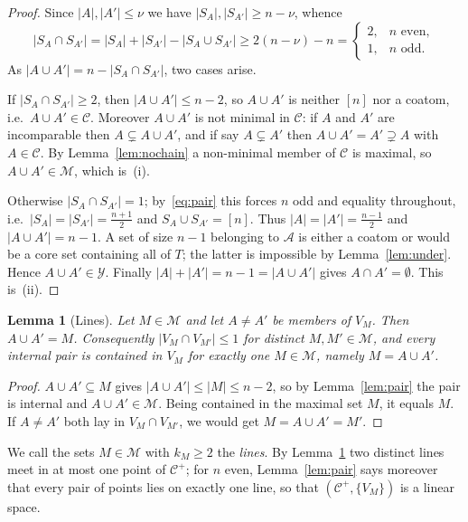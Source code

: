 \documentclass[11pt,a4paper]{amsart}
\theoremstyle{plain}
\newtheorem{lemma}[theorem]{Lemma}
\theoremstyle{definition}
\newcommand{\A}{\mathcal{A}}
\newcommand{\Cc}{\mathcal{C}}
\newcommand{\Mm}{\mathcal{M}}
\newcommand{\Yy}{\mathcal{Y}}
\newcommand{\Cp}{\Cc^{+}}
\begin{document}
\begin{proof}
Since $|A|,|A'|\le\nu$ we have
$|S_A|,|S_{A'}|\ge n-\nu$, whence
\begin{equation}\label{eq:pair}
  |S_A\cap S_{A'}|
  =
  |S_A|+|S_{A'}|-|S_A\cup S_{A'}|
  \ge
  2(n-\nu)-n
  =
  \begin{cases}
    2,& n\text{ even},\\
    1,& n\text{ odd}.
  \end{cases}
\end{equation}
As $|A\cup A'|=n-|S_A\cap S_{A'}|$, two cases arise.

If $|S_A\cap S_{A'}|\ge2$, then $|A\cup A'|\le n-2$, so $A\cup A'$ is neither
$[n]$ nor a coatom, i.e.\ $A\cup A'\in\Cc$. Moreover $A\cup A'$ is not minimal
in $\Cc$: if $A$ and $A'$ are incomparable then
$A\subsetneq A\cup A'$, and if say $A\subsetneq A'$ then
$A\cup A'=A'\supsetneq A$ with $A\in\Cc$. By Lemma~\ref{lem:nochain} a
non-minimal member of $\Cc$ is maximal, so $A\cup A'\in\Mm$, which is~(i).

Otherwise $|S_A\cap S_{A'}|=1$; by~\eqref{eq:pair} this forces $n$ odd and
equality throughout, i.e.\ $|S_A|=|S_{A'}|=\frac{n+1}{2}$ and
$S_A\cup S_{A'}=[n]$. Thus $|A|=|A'|=\frac{n-1}{2}$ and
$|A\cup A'|=n-1$. A set of size $n-1$ belonging to $\A$ is either a coatom or
would be a core set containing all of $T$; the latter is impossible by
Lemma~\ref{lem:under}. Hence $A\cup A'\in\Yy$. Finally
$|A|+|A'|=n-1=|A\cup A'|$ gives $A\cap A'=\emptyset$. This is~(ii).
\end{proof}

\begin{lemma}[Lines]\label{lem:lines}
Let $M\in\Mm$ and let $A\ne A'$ be members of $V_M$. Then $A\cup A'=M$.
Consequently $|V_M\cap V_{M'}|\le1$ for distinct $M,M'\in\Mm$, and every
internal pair is contained in $V_M$ for exactly one $M\in\Mm$, namely
$M=A\cup A'$.
\end{lemma}

\begin{proof}
$A\cup A'\subseteq M$ gives $|A\cup A'|\le|M|\le n-2$, so by
Lemma~\ref{lem:pair} the pair is internal and $A\cup A'\in\Mm$. Being contained
in the maximal set $M$, it equals $M$. If $A\ne A'$ both lay in
$V_M\cap V_{M'}$, we would get $M=A\cup A'=M'$.
\end{proof}

We call the sets $M\in\Mm$ with $k_M\ge2$ the \emph{lines}. By
Lemma~\ref{lem:lines} two distinct lines meet in at most one point of $\Cp$;
for $n$ even, Lemma~\ref{lem:pair} says moreover that every pair of points lies
on exactly one line, so that $(\Cp,\{V_M\})$ is a linear space.
\end{document}
